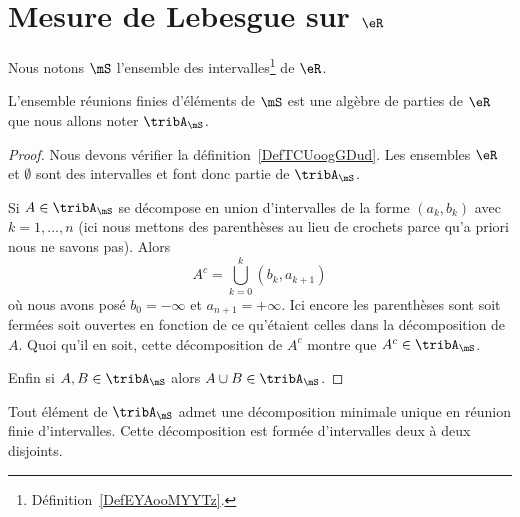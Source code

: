 
\section{Mesure de Lebesgue sur \texorpdfstring{$ \eR$}{R}}
\label{SecZTFooXlkwk}

Nous notons \( \mS\) l'ensemble des intervalles\footnote{Définition~\ref{DefEYAooMYYTz}.} de \( \eR\).

\begin{proposition}
    L'ensemble réunions finies d'éléments de \( \mS\) est une algèbre de parties de \( \eR\) que nous allons noter \( \tribA_{\mS}\).
\end{proposition}

\begin{proof}

    Nous devons vérifier la définition~\ref{DefTCUoogGDud}. Les ensembles \( \eR\) et \( \emptyset\) sont des intervalles et font donc partie de \( \tribA_{\mS}\).

    Si \( A\in\tribA_{\mS}\) se décompose en union d'intervalles de la forme \( (a_k,b_k)\) avec \( k=1,\ldots, n\) (ici nous mettons des parenthèses au lieu de crochets parce qu'a priori nous ne savons pas). Alors
    \begin{equation}
        A^c=\bigcup_{k=0}^{k}(b_k,a_{k+1})
    \end{equation}
    où nous avons posé \( b_0=-\infty\) et \( a_{n+1}=+\infty\). Ici encore les parenthèses sont soit fermées soit ouvertes en fonction de ce qu'étaient celles dans la décomposition de \( A\). Quoi qu'il en soit, cette décomposition de \( A^c\) montre que \( A^c\in\tribA_{\mS}\).

    Enfin si \( A,B\in\tribA_{\mS}\) alors \( A\cup B\in\tribA_{\mS}\).
\end{proof}

\begin{lemma}
    Tout élément de \( \tribA_{\mS}\) admet une décomposition minimale unique en réunion finie d'intervalles. Cette décomposition est formée d'intervalles deux à deux disjoints.
\end{lemma}

